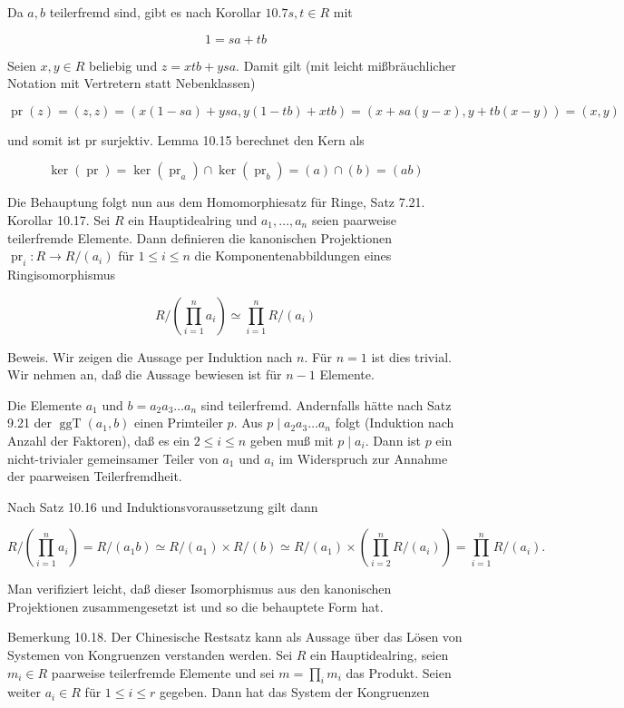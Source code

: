 \documentclass[10pt, letterpaper]{article}
\begin{document}
Da $a, b$ teilerfremd sind, gibt es nach Korollar $10.7 s, t \in R$ mit

$$
1=s a+t b
$$

Seien $x, y \in R$ beliebig und $z=x t b+y s a$. Damit gilt (mit leicht mißbräuchlicher Notation mit Vertretern statt Nebenklassen)

$$
\operatorname{pr}(z)=(z, z)=(x(1-s a)+y s a, y(1-t b)+x t b)=(x+s a(y-x), y+t b(x-y))=(x, y)
$$

und somit ist pr surjektiv. Lemma 10.15 berechnet den Kern als

$$
\operatorname{ker}(\operatorname{pr})=\operatorname{ker}\left(\operatorname{pr}_{a}\right) \cap \operatorname{ker}\left(\operatorname{pr}_{b}\right)=(a) \cap(b)=(a b)
$$

Die Behauptung folgt nun aus dem Homomorphiesatz für Ringe, Satz 7.21.\\
Korollar 10.17. Sei $R$ ein Hauptidealring und $a_{1}, \ldots, a_{n}$ seien paarweise teilerfremde Elemente. Dann definieren die kanonischen Projektionen $\operatorname{pr}_{i}: R \rightarrow R /\left(a_{i}\right)$ für $1 \leq i \leq n$ die Komponentenabbildungen eines Ringisomorphismus

$$
R /\left(\prod_{i=1}^{n} a_{i}\right) \simeq \prod_{i=1}^{n} R /\left(a_{i}\right)
$$

Beweis. Wir zeigen die Aussage per Induktion nach $n$. Für $n=1$ ist dies trivial. Wir nehmen an, daß die Aussage bewiesen ist für $n-1$ Elemente.

Die Elemente $a_{1}$ und $b=a_{2} a_{3} \ldots a_{n}$ sind teilerfremd. Andernfalls hätte nach Satz 9.21 der $\operatorname{ggT}\left(a_{1}, b\right)$ einen Primteiler $p$. Aus $p \mid a_{2} a_{3} \ldots a_{n}$ folgt (Induktion nach Anzahl der Faktoren), daß es ein $2 \leq i \leq n$ geben muß mit $p \mid a_{i}$. Dann ist $p$ ein nicht-trivialer gemeinsamer Teiler von $a_{1}$ und $a_{i}$ im Widerspruch zur Annahme der paarweisen Teilerfremdheit.

Nach Satz 10.16 und Induktionsvoraussetzung gilt dann

$$
R /\left(\prod_{i=1}^{n} a_{i}\right)=R /\left(a_{1} b\right) \simeq R /\left(a_{1}\right) \times R /(b) \simeq R /\left(a_{1}\right) \times\left(\prod_{i=2}^{n} R /\left(a_{i}\right)\right)=\prod_{i=1}^{n} R /\left(a_{i}\right) .
$$

Man verifiziert leicht, daß dieser Isomorphismus aus den kanonischen Projektionen zusammengesetzt ist und so die behauptete Form hat.

Bemerkung 10.18. Der Chinesische Restsatz kann als Aussage über das Lösen von Systemen von Kongruenzen verstanden werden. Sei $R$ ein Hauptidealring, seien $m_{i} \in R$ paarweise teilerfremde Elemente und sei $m=\prod_{i} m_{i}$ das Produkt. Seien weiter $a_{i} \in R$ für $1 \leq i \leq r$ gegeben. Dann hat das System der Kongruenzen
\end{document}

